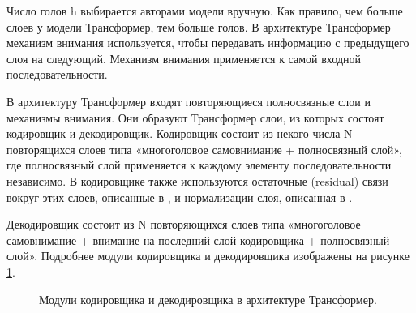 Число голов h выбирается авторами модели вручную. Как правило, чем больше слоев у модели Трансформер, тем больше голов. 
В архитектуре Трансформер механизм внимания используется, чтобы передавать информацию с предыдущего слоя на следующий. Механизм внимания применяется к самой входной последовательности.


В архитектуру Трансформер входят повторяющиеся полносвязные слои и механизмы внимания. Они образуют Трансформер слои, из которых состоят кодировщик и декодировщик. Кодировщик состоит из некого числа N повторящихся слоев типа «многоголовое самовнимание + полносвязный слой», где полносвязный слой применяется к каждому элементу последовательности независимо. В кодировщике также используются остаточные (residual) связи вокруг этих слоев, описанные в \cite{he_2016}, и нормализации слоя, описанная в \cite{ba_2016}.

Декодировщик состоит из N повторяющихся слоев типа «многоголовое самовнимание + внимание на последний слой кодировщика + полносвязный слой». 
 Подробнее модули кодировщика и декодировщика изображены на рисунке \ref{fig:Transformer4-EncoderDecoder}. 

\begin{figure}[ht]
 \caption{Модули кодировщика и декодировщика в архитектуре Трансформер.}\label{fig:Transformer4-EncoderDecoder}
\end{figure}

